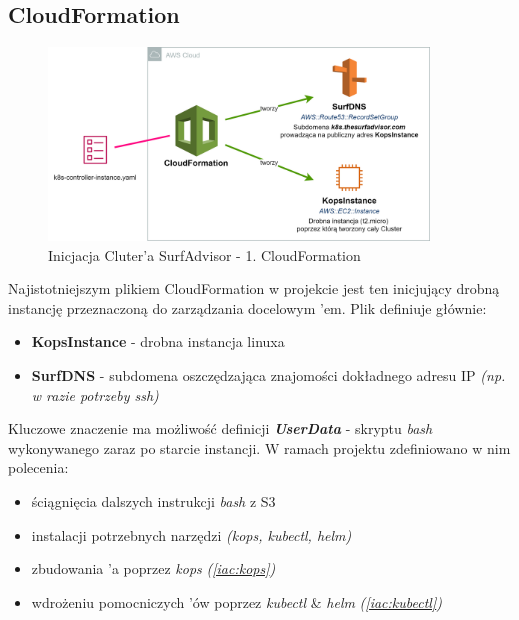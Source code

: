 \subsection{CloudFormation}
\label{iac:cf}

\begin{figure}[!ht]
	\begin{center}
		\includegraphics[width=0.9\textwidth]{img/IAC-step1}
	\end{center}
	\caption{Inicjacja Cluter'a SurfAdvisor - 1. CloudFormation}
\end{figure}

Najistotniejszym plikiem CloudFormation w projekcie jest ten inicjujący drobną instancję przeznaczoną do zarządzania docelowym 'em.
Plik  definiuje głównie: 

\begin{itemize}
    \item
    \textbf{KopsInstance} - drobna instancja linuxa 
    
    \item
    \textbf{SurfDNS} - subdomena oszczędzająca znajomości dokładnego adresu IP \emph{(np. w razie potrzeby ssh)}
\end{itemize} 

Kluczowe znaczenie ma możliwość definicji \emph{\textbf{UserData}} - skryptu \emph{bash} wykonywanego zaraz po starcie instancji. 
W ramach projektu zdefiniowano w nim polecenia:

\begin{itemize}
    \item
    ściągnięcia dalszych instrukcji \emph{bash} z S3

    \item
    instalacji potrzebnych narzędzi \emph{(kops, kubectl, helm)}
    
    \item
    zbudowania 'a poprzez \emph{kops} \emph{(\ref{iac:kops})}

    \item
    wdrożeniu pomocniczych 'ów poprzez \emph{kubectl} \& \emph{helm} \emph{(\ref{iac:kubectl})}
\end{itemize} 


